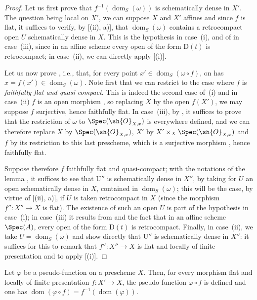 \begin{proof}
Let us first prove that $f^{-1}(\operatorname{dom}_S(\omega))$ is schematically dense in $X'$.
The question being local on $X'$, we can suppose $X$ and $X'$ affines and since $f$ is flat, it suffices to verify, by [(ii), a)], that $\operatorname{dom}_S(\omega)$ contains a retrocompact open $U$ schematically dense in $X$.
This is the hypothesis in case~(i), and of  in case~(iii), since in an affine scheme every open of the form $\mathrm{D}(t)$ is retrocompact;
in case~(ii), we can directly apply [(i)].

Let us now prove , i.e., that, for every point $x'\in\operatorname{dom}_S(\omega\circ f)$, on has $x=f(x')\in\operatorname{dom}_S(\omega)$.
Note first that we can restrict to the case where $f$ is \emph{faithfully flat and quasi-compact}.
This is indeed the second case of~(i) and in case~(ii) $f$ is an open morphism , so replacing $X$ by the open $f(X')$, we may suppose $f$ surjective, hence faithfully flat.
In case~(iii), by , it suffices to prove that the restriction of $\omega$ to $\Spec(\sh{O}_{X,x})$ is everywhere defined, and we can therefore replace $X$ by $\Spec(\sh{O}_{X,x})$, $X'$ by $X'\times_X\Spec(\sh{O}_{X,x})$ and $f$ by its restriction to this last prescheme, which is a surjective morphism , hence faithfully flat.

Suppose therefore $f$ faithfully flat and quasi-compact;
with the notations of the lemma , it suffices to see that $\mathrm{U}''$ is schematically dense in $X''$, by taking for $U$ an open schematically dense in $X$, contained in $\operatorname{dom}_S(\omega)$;
this will be the case, by virtue of [(ii), a)], if $U$ is taken retrocompact in $X$ (since the morphism $f'':X''\to X$ is flat).
The existence of such an open $U$ is part of the hypothesis in case~(i);
in case~(iii) it results from  and the fact that in an affine scheme $\Spec(A)$, every open of the form $\mathrm{D}(t)$ is retrocompact.
Finally, in case~(ii), we take $U=\operatorname{dom}_S(\omega)$ and show directly that $\mathrm{U}''$ is schematically dense in $X''$:
it suffices for this to remark that $f'':X''\to X$ is flat and locally of finite presentation and to apply [(i)].
\end{proof}

\begin{corollary}[20.3.12]
\label{IV.20.3.12}
Let $\varphi$ be a pseudo-function on a prescheme $X$.
Then, for every morphism flat and locally of finite presentation $f:X'\to X$, the pseudo-function $\varphi\circ f$ is defined and one has $\operatorname{dom}(\varphi\circ f)=f^{-1}(\operatorname{dom}(\varphi))$.
\end{corollary}

